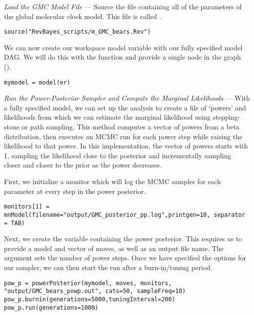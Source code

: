 \textit{Load the GMC Model File} --- Source the file containing all of the parameters of the global molecular clock model. This file is called {\textcolor{red}{}}.

{\tt \begin{snugshade*}
\begin{lstlisting}
source("RevBayes_scripts/m_GMC_bears.Rev")
\end{lstlisting}
\end{snugshade*}}

We can now create our workspace model variable with our fully specified model DAG. 
We will do this with the  function and provide a single node in the graph ().
{\tt \begin{snugshade*}
\begin{lstlisting}
mymodel = model(er)
\end{lstlisting}
\end{snugshade*}}

\textit{Run the Power-Posterior Sampler and Compute the Marginal Likelihoods} --- With a fully specified model, we can set up the  analysis to create a file of `powers' and likelihoods from which we can estimate the marginal likelihood using stepping-stone or path sampling. 
This method computes a vector of powers from a beta distribution, then executes an MCMC run for each power step while raising the likelihood to that power. In this implementation, the vector of powers starts with 1, sampling the likelihood close to the posterior and incrementally sampling closer and closer to the prior as the power decreases. 

First, we initialize a monitor which will log the MCMC samples for each parameter at every step in the power posterior.
{\tt \begin{snugshade*}
\begin{lstlisting}
monitors[1] = mnModel(filename="output/GMC_posterior_pp.log",printgen=10, separator = TAB)
\end{lstlisting}
\end{snugshade*}}

Next, we create the variable containing the power posterior. This requires us to provide a model and vector of moves, as well as an output file name. The  argument sets the number of power steps.
Once we have specified the options for our sampler, we can then start the run after a burn-in/tuning period.

{\tt \begin{snugshade*}
\begin{lstlisting}
pow_p = powerPosterior(mymodel, moves, monitors, "output/GMC_bears_powp.out", cats=50, sampleFreq=10) 
pow_p.burnin(generations=5000,tuningInterval=200)
pow_p.run(generations=1000)  
\end{lstlisting}
\end{snugshade*}}

